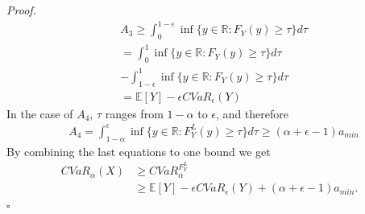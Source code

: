 \documentclass[letterpaper]{article} %
\newenvironment{proof}{\noindent\textit{Proof.}}{\hfill$\square$}
\begin{document}
\begin{proof}
	\begin{equation}
		\begin{aligned}
			&A_3 \geq \int_{0}^{1-\epsilon} \inf \{y\in \mathbb{R}:F_Y(y)\geq \tau\} d\tau \\
			&=\int_{0}^{1} \inf \{y\in \mathbb{R}:F_Y(y)\geq \tau\} d\tau \\
			&-\int_{1-\epsilon}^{1} \inf \{y\in \mathbb{R}:F_Y(y)\geq \tau\} d\tau \\
			&=\mathbb{E}[Y] - \epsilon CVaR_\epsilon(Y)
		\end{aligned}
	\end{equation}
	In the case of $A_4$, $\tau$ ranges from $1-\alpha$ to $\epsilon$, and therefore 
	\begin{equation}
		\begin{aligned}
			&A_4=\int_{1-\alpha}^{\epsilon} \inf \{y\in \mathbb{R}:F_Y^L(y)\geq \tau\} d\tau \geq (\alpha+\epsilon-1)a_{min}
		\end{aligned}
	\end{equation}
	By combining the last equations to one bound we get \begin{equation}
		\begin{aligned}
			CVaR_\alpha(X)&\geq CVaR_\alpha^{F_Y^L} \\
			&\geq \mathbb{E}[Y] - \epsilon CVaR_\epsilon(Y) + (\alpha+\epsilon-1)a_{min}.
		\end{aligned}
	\end{equation}
\end{proof}
\end{document}
